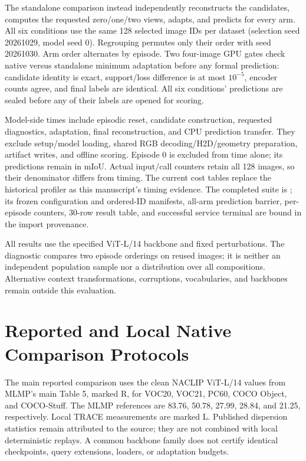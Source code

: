 The standalone comparison instead independently reconstructs the candidates, computes the requested zero/one/two views, adapts, and predicts for every arm. All six conditions use the same 128 selected image IDs per dataset (selection seed 20261029, model seed 0). Regrouping permutes only their order with seed 20261030. Arm order alternates by episode. Two four-image GPU gates check native versus standalone minimum adaptation before any formal prediction: candidate identity is exact, support/loss difference is at most $10^{-5}$, encoder counts agree, and final labels are identical. All six conditions' predictions are sealed before any of their labels are opened for scoring.



Model-side times include episodic reset, candidate construction, requested diagnostics, adaptation, final reconstruction, and CPU prediction transfer. They exclude setup/model loading, shared RGB decoding/H2D/geometry preparation, artifact writes, and offline scoring. Episode 0 is excluded from time alone; its predictions remain in mIoU. Actual input/call counters retain all 128 images, so their denominator differs from timing. The current cost tables replace the historical profiler as this manuscript's timing evidence. The completed suite is ; its frozen configuration and ordered-ID manifests, all-arm prediction barrier, per-episode counters, 30-row result table, and successful service terminal are bound in the import provenance.

All results use the specified ViT-L/14 backbone and fixed perturbations. The diagnostic compares two episode orderings on reused images; it is neither an independent population sample nor a distribution over all compositions. Alternative context transformations, corruptions, vocabularies, and backbones remain outside this evaluation.

\section{Reported and Local Native Comparison Protocols}
\label{app:native}
The main reported comparison uses the clean NACLIP ViT-L/14 values from MLMP's main Table 5, marked R, for VOC20, VOC21, PC60, COCO Object, and COCO-Stuff. The MLMP references are 83.76, 50.78, 27.99, 28.84, and 21.25, respectively. Local TRACE measurements are marked L. Published dispersion statistics remain attributed to the source; they are not combined with local deterministic replays. A common backbone family does not certify identical checkpoints, query extensions, loaders, or adaptation budgets.

